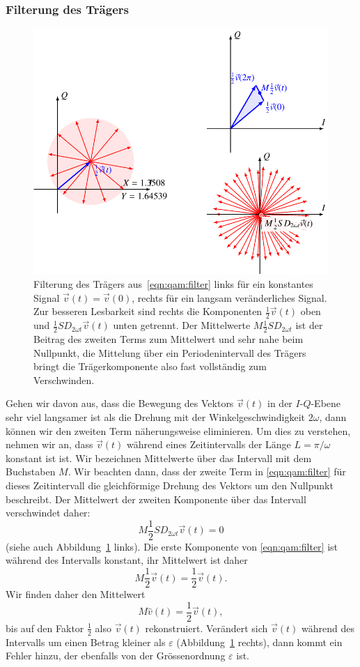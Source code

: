 \subsubsection{Filterung des Trägers}
\begin{figure}
\centering
\includegraphics{applications/qam/filter.pdf}
\caption{Filterung des Trägers aus~\eqref{eqn:qam:filter}
links für ein konstantes Signal $\vec{v}(t)=\vec{v}(0)$, rechts
für ein langsam veränderliches Signal.
Zur besseren Lesbarkeit sind rechts die Komponenten
$\frac12\vec{v}(t)$ oben und $\frac12SD_{2\omega t}\vec{v}(t)$
unten getrennt.
Der Mittelwerte $M\frac12SD_{2\omega t}$ ist der Beitrag des
zweiten Terms zum Mittelwert und sehr nahe beim Nullpunkt,
die Mittelung über ein Periodenintervall des Trägers bringt die
Trägerkomponente also fast vollständig zum Verschwinden.
\label{figure:qam:filter}}
\end{figure}
Gehen wir davon aus, dass die Bewegung des Vektors $\vec{v}(t)$ in
der $I$-$Q$-Ebene sehr viel langsamer ist als die Drehung mit der
Winkelgeschwindigkeit $2\omega$, dann können wir den zweiten Term
näherungsweise eliminieren.
Um dies zu verstehen, nehmen wir an, dass $\vec{v}(t)$ während eines
Zeitintervalls der Länge $L=\pi/\omega$ konstant ist ist.
Wir bezeichnen Mittelwerte über das Intervall mit dem Buchstaben $M$.
Wir beachten dann, dass der zweite Term in \eqref{eqn:qam:filter}
für dieses Zeitintervall die gleichförmige Drehung des Vektors
um den Nullpunkt beschreibt.
Der Mittelwert der zweiten Komponente über das Intervall verschwindet daher:
\[
M\frac12SD_{2\omega t}\vec{v}(t)
=
0
\]
(siehe auch Abbildung~\ref{figure:qam:filter} links).
Die erste Komponente von \eqref{eqn:qam:filter} ist während des Intervalls
konstant, ihr Mittelwert ist daher
\[
M\frac12\vec{v}(t)
=
\frac12\vec{v}(t).
\]
Wir finden daher den Mittelwert
\[
M\hat{v}(t)
=
\frac12\vec{v}(t),
\]
bis auf den Faktor $\frac12$ also $\vec{v}(t)$ rekonstruiert.
Verändert sich $\vec{v}(t)$ während des Intervalls um einen Betrag
kleiner als $\varepsilon$ (Abbildung~\ref{figure:qam:filter} rechts),
dann kommt ein Fehler hinzu, der ebenfalls
von der Grössenordnung $\varepsilon$ ist.

